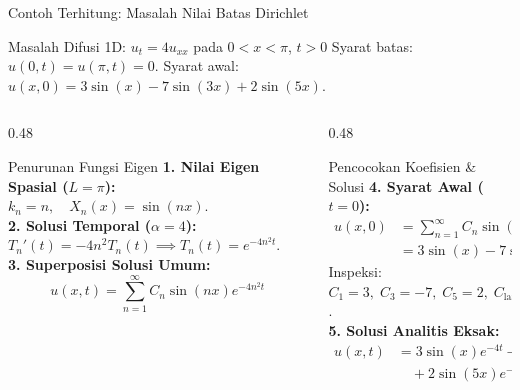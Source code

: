 \documentclass[aspectratio=169,10pt]{beamer}
\begin{document}
\begin{frame}{Contoh Terhitung: Masalah Nilai Batas Dirichlet}
  \begin{exampleblock}{Masalah Difusi 1D: $u_t = 4 u_{xx}$ pada $0 < x < \pi$, $t > 0$}
    Syarat batas: $u(0, t) = u(\pi, t) = 0$. Syarat awal: $u(x, 0) = 3\sin(x) - 7\sin(3x) + 2\sin(5x)$.
  \end{exampleblock}
  \begin{columns}[t]
    \begin{column}{0.48\textwidth}
      \begin{block}{Penurunan Fungsi Eigen}
        \small
        \textbf{1. Nilai Eigen Spasial ($L = \pi$):}
        $k_n = n, \quad X_n(x) = \sin(nx)$.\\[2pt]
        \textbf{2. Solusi Temporal ($\alpha = 4$):}
        $T_n'(t) = -4n^2 T_n(t) \implies T_n(t) = e^{-4n^2 t}$.\\[2pt]
        \textbf{3. Superposisi Solusi Umum:}
        \begin{equation*}
          u(x, t) = \sum_{n=1}^{\infty} C_n \sin(nx) e^{-4n^2 t}
        \end{equation*}
      \end{block}
    \end{column}
    \begin{column}{0.48\textwidth}
      \begin{alertblock}{Pencocokan Koefisien \& Solusi}
        \small
        \textbf{4. Syarat Awal ($t = 0$):}
        \begin{align*}
          u(x, 0) &= \sum_{n=1}^{\infty} C_n \sin(nx) \\
                  &= 3\sin(x) - 7\sin(3x) + 2\sin(5x)
        \end{align*}
        Inspeksi: $C_1 = 3, \; C_3 = -7, \; C_5 = 2, \; C_{\text{lain}} = 0$.\\[2pt]
        \textbf{5. Solusi Analitis Eksak:}
        \begin{align*}
          u(x, t) &= 3\sin(x)e^{-4t} - 7\sin(3x)e^{-36t} \\
                  &\quad + 2\sin(5x)e^{-100t}
        \end{align*}
      \end{alertblock}
    \end{column}
  \end{columns}
\end{frame}
\end{document}
